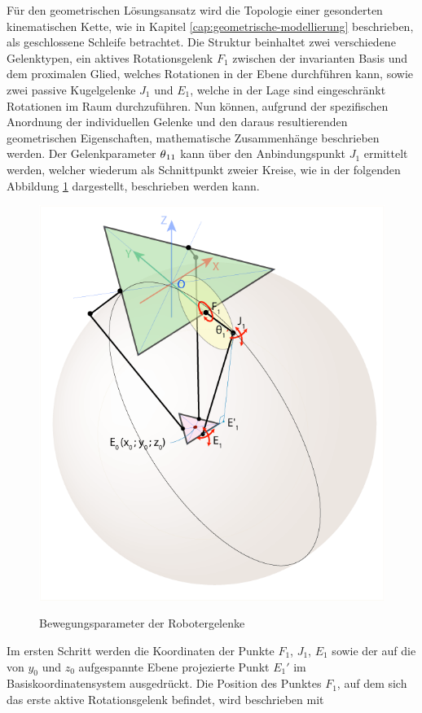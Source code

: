 \documentclass[Bachelor, BMR, ngerman]{twbook}
\begin{document}
    \noindent
    Für den geometrischen Lösungsansatz wird die Topologie einer gesonderten kinematischen Kette, wie in Kapitel \ref{cap:geometrische-modellierung} beschrieben, als geschlossene Schleife betrachtet. Die Struktur beinhaltet zwei verschiedene Gelenktypen, ein aktives Rotationsgelenk $F_1$ zwischen der invarianten Basis und dem proximalen Glied, welches Rotationen in der Ebene durchführen kann, sowie zwei passive Kugelgelenke $J_1$ und $E_1$, welche in der Lage sind eingeschränkt Rotationen im Raum durchzuführen. Nun können, aufgrund der spezifischen Anordnung der individuellen Gelenke und den daraus resultierenden geometrischen Eigenschaften, mathematische Zusammenhänge beschrieben werden. Der Gelenkparameter $\theta\textsubscript{11}$ kann über den Anbindungspunkt $J_1$ ermittelt werden, welcher wiederum als Schnittpunkt zweier Kreise, wie in der folgenden Abbildung \ref{fig:delta-param-isometric-view} dargestellt, beschrieben werden kann.
    \begin{figure}[H] 
      \centering
      {
        \includegraphics[width=0.5\linewidth]{delta-param-isometric-view.png}
      }
      \caption[Bewegungsparameter der Robotergelenke ]{Bewegungsparameter der Robotergelenke }
      \label{fig:delta-param-isometric-view}
    \end{figure}
    \noindent
    Im ersten Schritt werden die Koordinaten der Punkte $F_1$, $J_1$, $E_1$ sowie der auf die von $y_0$ und $z_0$ aufgespannte Ebene projezierte Punkt $E_1'$ im Basiskoordinatensystem ausgedrückt. Die Position des Punktes $F_1$, auf dem sich das erste aktive Rotationsgelenk befindet, wird beschrieben mit
    \newline
\end{document}
